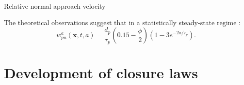 \documentclass{sintefbeamer}
\begin{document}
\begin{frame}{Relative normal approach velocity}
\begin{figure}[h!]
\end{figure}
The theoretical observations suggest that in a statistically steady-state regime :
\begin{equation}
  w_{pn}^a(\textbf{x},t,a) = \frac{d_p}{\tau_p} 
  \left(
      0.15
      -\frac{\phi}{2}
  \right)\left(
      1 - 3e^{-2a/\tau_p}
  \right).
\end{equation}
\end{frame}

\section{Development of closure laws}
\section*{}
\end{document}
